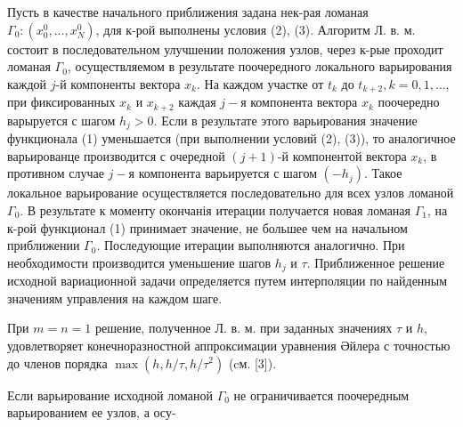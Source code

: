 \documentclass[10pt]{article}
\begin{document}
Пусть в качестве начального приближения задана нек-рая ломаная $\Gamma_{0}:\left(x_{0}^{0}, \ldots, x_{N}^{0}\right)$, для к-рой выполнены условия (2), (3). Алгоритм Л. в. м. состоит в последовательном улучшении положения узлов, через к-рые проходит ломаная $\Gamma_{0}$, осуществляемом в результате поочередного локального варьирования каждой $j$-й компоненты вектора $x_{k}$. На каждом участке от $t_{k}$ до $t_{k+2}, k=0,1, \ldots$, при фиксированных $x_{k}$ и $x_{k+2}$ каждая $j-я$ компонента вектора $x_{k}$ поочередно варыруется с шагом $h_{j}>0$. Если в результате этого варьирования значение функционала (1) уменьшается (при выполнении условий (2), (3)), то аналогичное варьированце производится с очередной $(j+1)$-й компонентой вектора $x_{k}$, в противном случае $j-я$ компонента варьируется с шагом $\left(-h_{j}\right)$. Такое локальное варьирование осуществляется последовательно для всех узлов ломаной $\Gamma_{0}$. В результате к моменту окончанія итерации получается новая ломаная $\Gamma_{1}$, на к-рой функционал (1) принимает значение, не большее чем на начальном приближении $\Gamma_{0}$. Последующие итерации выполняются аналогично. При необходимости производится уменьшение шагов $h_{j}$ и $\tau$. Приближенное решение исходной вариационной задачи определяется путем интерполяции по найденным значениям управления на каждом шаге.



При $m=n=1$ решение, полученное Л. в. м. при заданных значениях $\tau$ и $h$, удовлетворяет конечноразностной аппроксимации уравнения Әйлера с точностью до членов порядка $\max \left(h, h / \tau, h / \tau^{2}\right)$ (cм. [3]).



Если варьирование исходной ломаной $\Gamma_{0}$ не ограничивается поочередным варьированием ее узлов, а осу-
\end{document}
